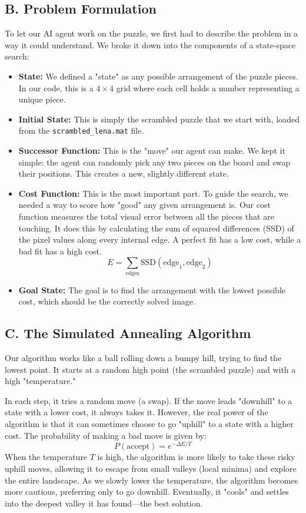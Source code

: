 \documentclass[10pt, a4paper, twocolumn]{article}
\begin{document}
\subsection*{B. Problem Formulation}
To let our AI agent work on the puzzle, we first had to describe the problem in a way it could understand. We broke it down into the components of a state-space search:

\begin{itemize}
    \item \textbf{State:} We defined a "state" as any possible arrangement of the puzzle pieces. In our code, this is a $4 \times 4$ grid where each cell holds a number representing a unique piece.
    
    \item \textbf{Initial State:} This is simply the scrambled puzzle that we start with, loaded from the \texttt{scrambled\_lena.mat} file.
    
    \item \textbf{Successor Function:} This is the "move" our agent can make. We kept it simple: the agent can randomly pick any two pieces on the board and swap their positions. This creates a new, slightly different state.
    
    \item \textbf{Cost Function:} This is the most important part. To guide the search, we needed a way to score how "good" any given arrangement is. Our cost function measures the total visual error between all the pieces that are touching. It does this by calculating the sum of squared differences (SSD) of the pixel values along every internal edge. A perfect fit has a low cost, while a bad fit has a high cost.
    $$ E = \sum_{\text{edges}} \text{SSD}(\text{edge}_1, \text{edge}_2) $$
    
    \item \textbf{Goal State:} The goal is to find the arrangement with the lowest possible cost, which should be the correctly solved image.
\end{itemize}

\subsection*{C. The Simulated Annealing Algorithm}
Our algorithm works like a ball rolling down a bumpy hill, trying to find the lowest point. It starts at a random high point (the scrambled puzzle) and with a high "temperature."

In each step, it tries a random move (a swap). If the move leads "downhill" to a state with a lower cost, it always takes it. However, the real power of the algorithm is that it can sometimes choose to go "uphill" to a state with a higher cost. The probability of making a bad move is given by:
$$ P(\text{accept}) = e^{-\Delta E / T} $$
When the temperature $T$ is high, the algorithm is more likely to take these risky uphill moves, allowing it to escape from small valleys (local minima) and explore the entire landscape. As we slowly lower the temperature, the algorithm becomes more cautious, preferring only to go downhill. Eventually, it "cools" and settles into the deepest valley it has found—the best solution.
\end{document}
